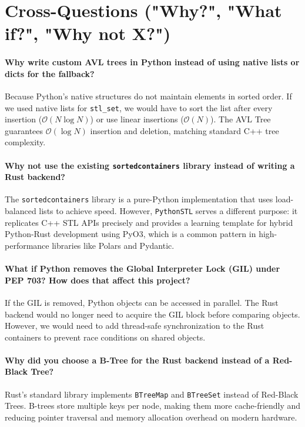 \documentclass[11pt,a4paper]{article}
\begin{document}
\newpage

\section{Cross-Questions ("Why?", "What if?", "Why not X?")}

\paragraph{Why write custom AVL trees in Python instead of using native lists or dicts for the fallback?}
Because Python's native structures do not maintain elements in sorted order. If we used native lists for \texttt{stl\_set}, we would have to sort the list after every insertion ($\mathcal{O}(N \log N)$) or use linear insertions ($\mathcal{O}(N)$). The AVL Tree guarantees $\mathcal{O}(\log N)$ insertion and deletion, matching standard C++ tree complexity.

\paragraph{Why not use the existing \texttt{sortedcontainers} library instead of writing a Rust backend?}
The \texttt{sortedcontainers} library is a pure-Python implementation that uses load-balanced lists to achieve speed. However, \texttt{PythonSTL} serves a different purpose: it replicates C++ STL APIs precisely and provides a learning template for hybrid Python-Rust development using PyO3, which is a common pattern in high-performance libraries like Polars and Pydantic.

\paragraph{What if Python removes the Global Interpreter Lock (GIL) under PEP 703? How does that affect this project?}
If the GIL is removed, Python objects can be accessed in parallel. The Rust backend would no longer need to acquire the GIL block before comparing objects. However, we would need to add thread-safe synchronization to the Rust containers to prevent race conditions on shared objects.

\paragraph{Why did you choose a B-Tree for the Rust backend instead of a Red-Black Tree?}
Rust's standard library implements \texttt{BTreeMap} and \texttt{BTreeSet} instead of Red-Black Trees. B-trees store multiple keys per node, making them more cache-friendly and reducing pointer traversal and memory allocation overhead on modern hardware.
\end{document}
